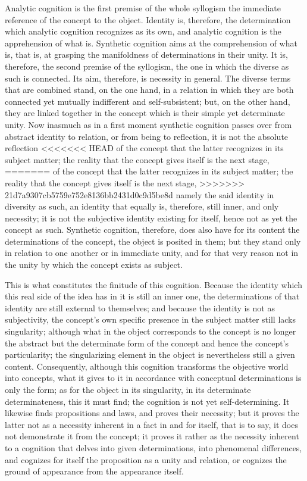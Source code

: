 Analytic cognition is the first premise of the whole syllogism
the immediate reference of the concept to the object.
Identity is, therefore, the determination
which analytic cognition recognizes as its own,
and analytic cognition is the apprehension of what is.
Synthetic cognition aims at the comprehension of what is,
that is, at grasping the manifoldness of
determinations in their unity.
It is, therefore, the second premise of the syllogism,
the one in which the diverse as such is connected.
Its aim, therefore, is necessity in general.
The diverse terms that are combined stand,
on the one hand, in a relation in which
they are both connected yet mutually
indifferent and self-subsistent;
but, on the other hand, they are linked together
in the concept which is their simple yet determinate unity.
Now inasmuch as in a first moment
synthetic cognition passes over
from abstract identity to relation,
or from being to reflection,
it is not the absolute reflection
<<<<<<< HEAD
of the concept that the latter recognizes in its subject matter;
the reality that the concept gives itself is the next stage,
=======
of the concept that the latter
recognizes in its subject matter;
the reality that the concept
gives itself is the next stage,
>>>>>>> 21d7a9307cb5759e752e8136bb2431d0c9d5be8d
namely the said identity in diversity as such,
an identity that equally is, therefore,
still inner, and only necessity;
it is not the subjective identity existing for itself,
hence not as yet the concept as such.
Synthetic cognition, therefore, does also have
for its content the determinations of the concept,
the object is posited in them;
but they stand only in relation to one another
or in immediate unity,
and for that very reason not in the unity
by which the concept exists as subject.

This is what constitutes the finitude of this cognition.
Because the identity which this real side of
the idea has in it is still an inner one,
the determinations of that identity are
still external to themselves;
and because the identity is not as subjectivity,
the concept's own specific presence in
the subject matter still lacks singularity;
although what in the object corresponds to
the concept is no longer the abstract
but the determinate form of the concept
and hence the concept's particularity;
the singularizing element in the object is
nevertheless still a given content.
Consequently, although this cognition
transforms the objective world into concepts,
what it gives to it in accordance
with conceptual determinations is only the form;
as for the object in its singularity,
in its determinate determinateness,
this it must find;
the cognition is not yet self-determining.
It likewise finds propositions and laws,
and proves their necessity;
but it proves the latter not as a necessity
inherent in a fact in and for itself,
that is to say, it does not
demonstrate it from the concept;
it proves it rather as the necessity
inherent to a cognition
that delves into given determinations,
into phenomenal differences,
and cognizes for itself the proposition as
a unity and relation,
or cognizes the ground of appearance
from the appearance itself.

